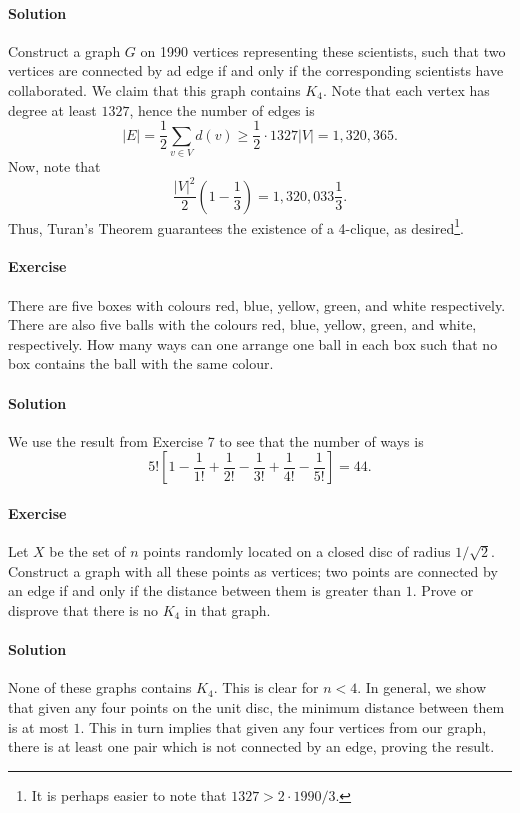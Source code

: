 \documentclass[10pt]{article}
\newcounter{prob}
\newcommand{\problem}{\stepcounter{prob}\paragraph{Exercise \arabic{prob}}}
\newcommand{\solution}{\paragraph{Solution}}
\begin{document}
    \solution Construct a graph $G$ on 1990 vertices representing these scientists,
    such that two vertices are connected by ad edge if and only if the corresponding
    scientists have collaborated. We claim that this graph contains $K_4$. Note that
    each vertex has degree at least $1327$, hence the number of edges is \[
        |E| = \frac{1}{2}\sum_{v \in V} d(v) \geq \frac{1}{2}\cdot 1327|V| =
        1,320,365.
    \] Now, note that \[
        \frac{|V|^2}{2}\left(1 - \frac{1}{3}\right) = 1,320,033 \frac{1}{3}.
    \] Thus, Turan's Theorem guarantees the existence of a 4-clique, as
    desired\footnote{It is perhaps easier to note that $1327 > 2\cdot 1990 / 3$.}.

    \problem There are five boxes with colours red, blue, yellow, green, and white
    respectively. There are also five balls with the colours red, blue, yellow,
    green, and white, respectively. How many ways can one arrange one ball in each
    box such that no box contains the ball with the same colour.

    \solution We use the result from Exercise 7 to see that the number of ways is \[
        5!\left[1 - \frac{1}{1!} + \frac{1}{2!} - \frac{1}{3!} + \frac{1}{4!} -
        \frac{1}{5!}\right] = 44.
    \]

    \problem Let $X$ be the set of $n$ points randomly located on a closed disc of
    radius $1 / \sqrt{2}$. Construct a graph with all these points as vertices; two
    points are connected by an edge if and only if the distance between them is
    greater than $1$. Prove or disprove that there is no $K_4$ in that graph.

    \solution None of these graphs contains $K_4$. This is clear for $n < 4$. In
    general, we show that given any four points on the unit disc, the minimum
    distance between them is at most $1$. This in turn implies that given any four
    vertices from our graph, there is at least one pair which is not connected by an
    edge, proving the result.
\end{document}
